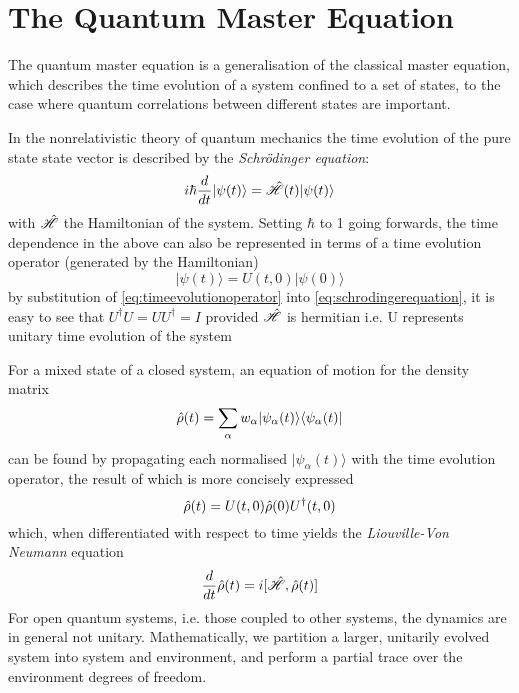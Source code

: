 \section{The Quantum Master Equation}
The quantum master equation is a generalisation of the classical master equation, which describes the time evolution of a system confined to a set of states, to the case where quantum correlations between different states are important. 

In the nonrelativistic theory of quantum mechanics the time evolution of the pure state state vector is described by the \emph{Schr\"odinger equation}:
\begin{equation}
	i\hbar \frac{d}{dt} |\psi(t)\rangle = \hat{\mathscr{H}}(t) |\psi(t) \rangle
        \label{eq:schrodingerequation}
\end{equation}
with $\hat{\mathscr{H}}$ the Hamiltonian of the system.
Setting $\hbar$ to 1 going forwards, the time dependence in the above can also be represented in terms of a time evolution operator (generated by the Hamiltonian)
\begin{equation}
        |\psi(t) \rangle = U(t, 0) | \psi(0) \rangle 
        \label{eq:timeevolutionoperator}
\end{equation}
by substitution of \cref{eq:timeevolutionoperator} into \ref{eq:schrodingerequation}, it is easy to see that $U^{\dagger}U = UU^\dagger = I$ provided $\hat{\mathscr{H}}$ is hermitian i.e. U represents unitary time evolution of the system

For a mixed state of a closed system, an equation of motion for the density matrix
\begin{equation}
	\hat{\rho} (t) = \sum_\alpha w_{\alpha} |\psi_\alpha (t) \rangle \langle \psi_\alpha (t) |
\end{equation}
can be found by propagating each normalised $| \psi_\alpha (t) \rangle$ with the time evolution operator, the result of which is more concisely expressed
\begin{equation}
	\hat{\rho} (t) = U(t, 0)\hat{\rho} (0) U^\dagger (t, 0)
\end{equation}
which, when differentiated with respect to time yields the \emph{Liouville-Von Neumann} equation
\begin{equation}
	\frac{d}{dt}\hat{\rho}(t) = i [\hat{\mathscr{H}}, \hat{\rho} (t) ]
\end{equation}
For open quantum systems, i.e. those coupled to other systems, the dynamics are in general not unitary. 
Mathematically, we partition a larger, unitarily evolved system into system and environment, and perform a partial trace over the environment degrees of freedom.

